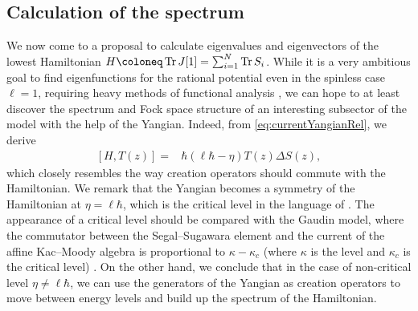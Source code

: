 \subsection{Calculation of the spectrum} \label{subsection:spectrum}

We now come to a proposal to calculate eigenvalues and eigenvectors of the lowest Hamiltonian $H \coloneq \Tr J[1] = \sum_{i=1}^N \Tr S_i$. While it is a very ambitious goal to find eigenfunctions for the rational potential even in the spinless case $\ell=1$, requiring heavy methods of functional analysis \cite{hallnas_joint_2012,hallnas_joint_2017,hallnas_joint_2019}, we can hope to at least discover the spectrum and Fock space structure of an interesting subsector of the model with the help of the Yangian. Indeed, from \eqref{eq:currentYangianRel}, we derive
\begin{equation}\label{eq:HamiltonianYangianRel}
\begin{aligned}
[H,T(z)]
={}& \hbar (\ell\hbar-\eta) T(z) \Delta S(z),
\end{aligned}
\end{equation}
which closely resembles the way creation operators should commute with the Hamiltonian. We remark that the Yangian becomes a symmetry of the Hamiltonian at $\eta = \ell\hbar$, which is the critical level in the language of \cite{reshetikhin_central_1990}. The appearance of a critical level should be compared with the Gaudin model, where the commutator between the Segal--Sugawara element and the current of the affine Kac--Moody algebra is proportional to $\kappa-\kappa_c$ (where $\kappa$ is the level and $\kappa_c$ is the critical level) \cite{frenkel_langlands_2010}. On the other hand, we conclude that in the case of non-critical level $\eta \neq \ell\hbar$, we can use the generators of the Yangian as creation operators to move between energy levels and build up the spectrum of the Hamiltonian.

